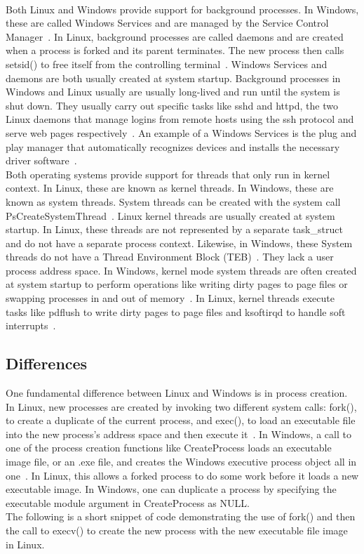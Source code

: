 \documentclass[letterpaper,10pt,titlepage]{article}
\begin{document}
\\
\linebreak
Both Linux and Windows provide support for background processes. In Windows,
these are called Windows Services and are managed by the Service Control 
Manager~\cite{msdn-serv}. In Linux, background processes are called daemons and are created 
when a process is forked and its parent terminates. The new process then calls
setsid() to free itself from the controlling terminal~\cite{tlpi37}. Windows Services and 
daemons are both usually created at system startup. Background processes in
Windows and Linux usually are usually long-lived and run until the system 
is shut down. They usually carry out specific tasks like sshd and httpd, the
two Linux daemons that manage logins from remote hosts using the ssh protocol
and serve web pages respectively~\cite{tlpi37}. An example of a Windows Services is 
the plug and play manager that automatically recognizes devices and installs
the necessary driver software~\cite{rsw6}.
\\
\linebreak
Both operating systems provide support for threads that only run in kernel 
context. In Linux, these are known as kernel threads. In Windows, these are 
known as system threads. System threads can be created with the system call
PsCreateSystemThread~\cite{tm11}. Linux kernel threads are usually created at system 
startup. In Linux, these threads are not represented by a separate task\_struct
and do not have a separate process context. Likewise, in Windows, these
System threads do not have a Thread Environment Block (TEB)~\cite{rsw6}. They lack a user
process address space. In Windows, kernel mode system threads are often 
created at system startup to perform operations like writing dirty pages to
page files or swapping processes in and out of memory~\cite{tm11}. In Linux, kernel 
threads execute tasks like pdflush to write dirty pages to page files and 
ksoftirqd to handle soft interrupts~\cite{love3}.
\subsection{Differences}

One fundamental difference between Linux and Windows is in process creation. 
In Linux, new processes are created by invoking two different system calls:
fork(), to create a duplicate of the current process, and exec(), to load an
executable file into the new process's address space and then execute it~\cite{tm10}. 
In Windows, a call to one of the process creation functions like CreateProcess
loads an executable image file, or an .exe file, and creates the Windows
executive process object all in one~\cite{msdn-cp}. In Linux, this allows a forked process
to do some work before it loads a new executable image. In Windows, one can
duplicate a process by specifying the executable module argument in 
CreateProcess as NULL. 
\\
\linebreak
The following is a short snippet of code demonstrating the use of fork() and
then the call to execv() to create the new process with the new executable
file image in Linux.
\end{document}
